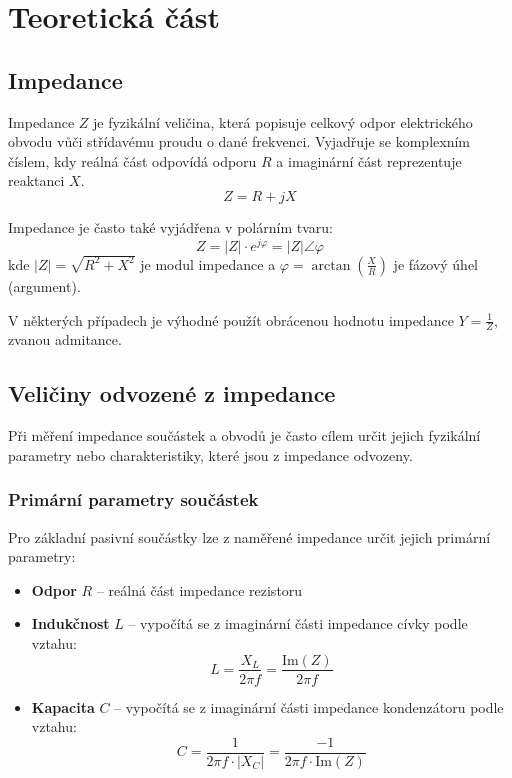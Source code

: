 \chapter{Teoretická část}

\section{Impedance}

Impedance $Z$ je fyzikální veličina, která popisuje celkový odpor elektrického obvodu vůči střídavému proudu o dané frekvenci.
Vyjadřuje se komplexním číslem, kdy reálná část odpovídá odporu $R$ a imaginární část reprezentuje reaktanci $X$.
\begin{equation}
Z = R + jX
\end{equation}

Impedance je často také vyjádřena v polárním tvaru:
\begin{equation}
Z = |Z| \cdot e^{j\varphi} = |Z| \angle \varphi
\end{equation}
kde $|Z| = \sqrt{R^2 + X^2}$ je modul impedance a $\varphi = \arctan(\frac{X}{R})$ je fázový úhel (argument).

V některých případech je výhodné použít obrácenou hodnotu impedance $Y = \frac{1}{Z}$, zvanou admitance. \cite{KeysightImpedanceHandbook}

\section{Veličiny odvozené z impedance}
Při měření impedance součástek a obvodů je často cílem určit jejich fyzikální parametry nebo charakteristiky, které jsou z impedance odvozeny.

\subsection{Primární parametry součástek}

Pro základní pasivní součástky lze z naměřené impedance určit jejich primární parametry:

\begin{itemize}
    \item \textbf{Odpor} $R$ -- reálná část impedance rezistoru
    \item \textbf{Indukčnost} $L$ -- vypočítá se z imaginární části impedance cívky podle vztahu:
    \begin{equation}
    L = \frac{X_L}{2\pi f} = \frac{\text{Im}(Z)}{2\pi f}
    \end{equation}
    \item \textbf{Kapacita} $C$ -- vypočítá se z imaginární části impedance kondenzátoru podle vztahu:
    \begin{equation}
    C = \frac{1}{2\pi f \cdot |X_C|} = \frac{-1}{2\pi f \cdot \text{Im}(Z)}
    \end{equation}
\end{itemize}

